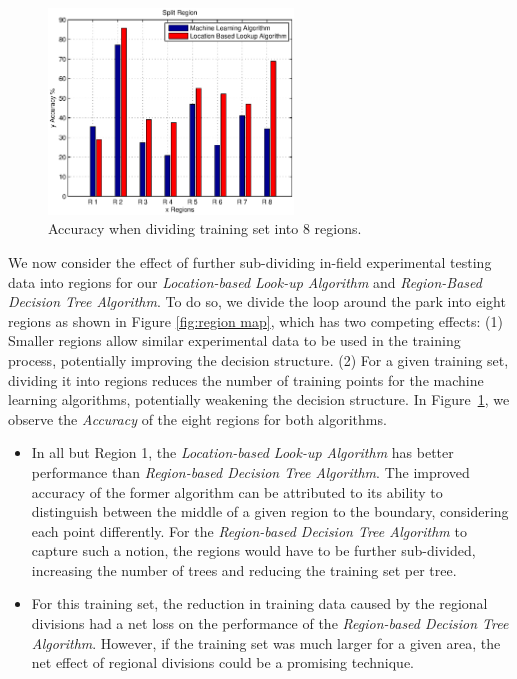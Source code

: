 \begin{figure}
\centering
\includegraphics[width=65mm]{figure/mvsl}
\vspace{-0.1in}
\caption{Accuracy when dividing training set into 8 regions.}
\label{fig:mvsl}
\vspace{-0.2in}
\end{figure}

We now consider the effect of further sub-dividing in-field experimental testing data into regions for our \emph{Location-based Look-up Algorithm} 
and \emph{Region-Based Decision Tree Algorithm}. To do so, we divide the    
loop around the park into eight regions as shown in Figure \ref{fig:region map},
which has two competing effects: (1) Smaller regions allow similar experimental
data to be used in the training process, potentially improving the decision
structure. (2) For a given training set, dividing it into regions reduces
the number of training points for the machine learning algorithms, potentially
weakening the decision structure.  In Figure~\ref{fig:mvsl}, we observe 
the \emph{Accuracy} of the eight regions for both algorithms.
\begin{itemize}
\item
In all but Region 1, the \emph{Location-based Look-up Algorithm} has better 
performance than \emph{Region-based Decision Tree Algorithm}. The improved
accuracy of the former algorithm can be attributed to its ability to
distinguish between the middle of a given region to the boundary, considering
each point differently. For the \emph{Region-based Decision Tree Algorithm}
to capture such a notion, the regions would have to be further sub-divided,
increasing the number of trees and reducing the training set per tree.
\item
For this training set, the reduction in training data caused by the
regional divisions had a net loss on the performance of the \emph{Region-based Decision Tree Algorithm}. However, if the training set was much larger
for a given area, the net effect of regional divisions could be a promising
technique.
\end{itemize}




